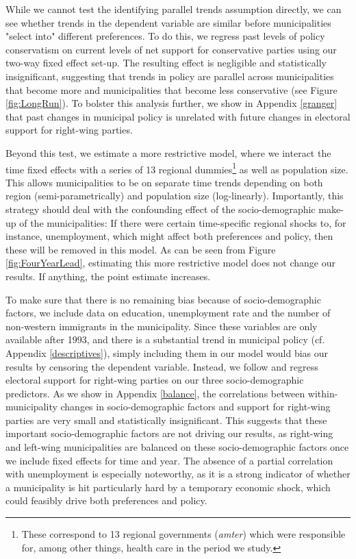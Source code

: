 \documentclass[a4paper,12pt]{article}
\begin{document}
While we cannot test the identifying parallel trends assumption directly, we can see whether trends in the dependent variable are similar before municipalities "select into" different preferences.  To do this, we regress past levels of policy conservatism on current levels of net support for conservative parties using our two-way fixed effect set-up. The resulting effect is negligible and statistically insignificant, suggesting that trends in policy are parallel across municipalities that become more and municipalities that become less conservative  (see Figure \ref{fig:LongRun}). To  bolster this analysis further,  we show in Appendix \ref{granger} that past changes in municipal policy is unrelated with future changes in electoral support for right-wing parties.


Beyond this test,  we estimate a more restrictive model, where we interact the time fixed effects with a series of 13 regional dummies\footnote{These correspond to  13 regional governments (\textit{amter}) which were responsible for, among other things, health care in the period we study.} as well as population size. This allows municipalities to be on separate time trends depending on both region (semi-parametrically) and population size (log-linearly). Importantly, this strategy should deal with the confounding effect of the socio-demographic make-up of the municipalities: If there were certain time-specific regional shocks to, for instance, unemployment, which might affect both preferences and policy, then these will be removed in this model. As can be seen from Figure \ref{fig:FourYearLead}, estimating this more restrictive model does not change our results. If anything, the point estimate increases.

To make sure that there is no remaining bias because of socio-demographic factors, we include data on education, unemployment rate and the number of non-western immigrants in the municipality. Since these variables are only available after 1993, and there is a substantial trend in municipal policy (cf. Appendix \ref{descriptives}), simply including them in our model would bias our results by censoring the dependent variable. Instead, we follow \citep{pei2018poorly} and regress electoral support for right-wing parties on our three socio-demographic predictors. As we show in Appendix \ref{balance}, the correlations between within-municipality changes in socio-demographic factors and support for right-wing parties are very small and statistically insignificant. This suggests that these important socio-demographic factors are not driving our results, as right-wing and left-wing municipalities are balanced on these socio-demographic factors once we include fixed effects for time and year. The absence of a partial correlation with unemployment is especially noteworthy, as it is a strong indicator of whether a municipality is hit particularly hard by a temporary economic shock, which could feasibly drive both preferences and policy.
\end{document}
